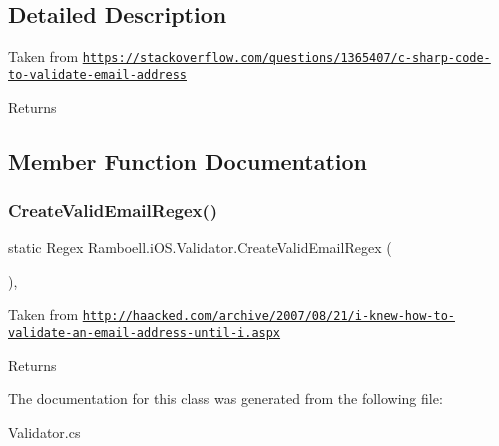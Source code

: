 \subsection{Detailed Description}
Taken from \href{https://stackoverflow.com/questions/1365407/c-sharp-code-to-validate-email-address}{\tt https\+://stackoverflow.\+com/questions/1365407/c-\/sharp-\/code-\/to-\/validate-\/email-\/address} 

\begin{DoxyReturn}{Returns}

\end{DoxyReturn}


\subsection{Member Function Documentation}
\mbox{\label{class_ramboell_1_1i_o_s_1_1_validator_a6e258a73cdcd1a90685fc026e7e92ff3}} 
\subsubsection{\texorpdfstring{Create\+Valid\+Email\+Regex()}{CreateValidEmailRegex()}}
{\footnotesize\ttfamily static Regex Ramboell.\+i\+O\+S.\+Validator.\+Create\+Valid\+Email\+Regex (\begin{DoxyParamCaption}{ }\end{DoxyParamCaption})\hspace{0.3cm}{\ttfamily [static]}, {\ttfamily [private]}}



Taken from \href{http://haacked.com/archive/2007/08/21/i-knew-how-to-validate-an-email-address-until-i.aspx}{\tt http\+://haacked.\+com/archive/2007/08/21/i-\/knew-\/how-\/to-\/validate-\/an-\/email-\/address-\/until-\/i.\+aspx} 

\begin{DoxyReturn}{Returns}

\end{DoxyReturn}


The documentation for this class was generated from the following file\+:\begin{DoxyCompactItemize}
\item 
Validator.\+cs\end{DoxyCompactItemize}
